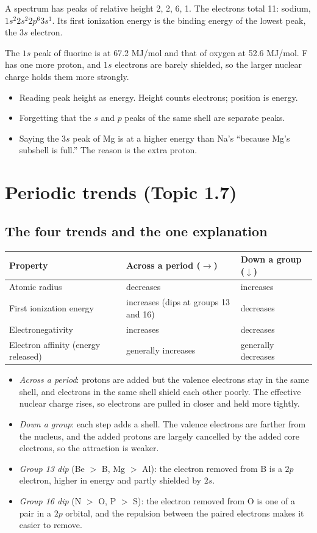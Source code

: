 \documentclass[11pt]{article}
\begin{document}
 A spectrum has peaks of relative height 2, 2, 6, 1. The electrons total 11: sodium, $1s^2 2s^2 2p^6 3s^1$. Its first ionization energy is the binding energy of the lowest peak, the $3s$ electron.

 The $1s$ peak of fluorine is at 67.2 MJ/mol and that of oxygen at 52.6 MJ/mol. F has one more proton, and $1s$ electrons are barely shielded, so the larger nuclear charge holds them more strongly.

\errorsh
\begin{itemize}
\item Reading peak height as energy. Height counts electrons; position is energy.
\item Forgetting that the $s$ and $p$ peaks of the same shell are separate peaks.
\item Saying the $3s$ peak of Mg is at a higher energy than Na's ``because Mg's subshell is full.'' The reason is the extra proton.
\end{itemize}

\section{Periodic trends (Topic 1.7)}\label{t:1.7}
\subsection{The four trends and the one explanation}
\begin{center}
\begin{tabular}{lll}\toprule
Property & Across a period ($\rightarrow$) & Down a group ($\downarrow$) \\ \midrule
Atomic radius & decreases & increases \\
First ionization energy & increases (dips at groups 13 and 16) & decreases \\
Electronegativity & increases & decreases \\
Electron affinity (energy released) & generally increases & generally decreases \\ \bottomrule
\end{tabular}
\end{center}
\begin{itemize}
\item \emph{Across a period}: protons are added but the valence electrons stay in the same shell, and electrons in the same shell shield each other poorly. The effective nuclear charge rises, so electrons are pulled in closer and held more tightly.
\item \emph{Down a group}: each step adds a shell. The valence electrons are farther from the nucleus, and the added protons are largely cancelled by the added core electrons, so the attraction is weaker.
\item \emph{Group 13 dip} (Be $>$ B, Mg $>$ Al): the electron removed from B is a $2p$ electron, higher in energy and partly shielded by $2s$.
\item \emph{Group 16 dip} (N $>$ O, P $>$ S): the electron removed from O is one of a pair in a $2p$ orbital, and the repulsion between the paired electrons makes it easier to remove.
\end{itemize}
\end{document}

